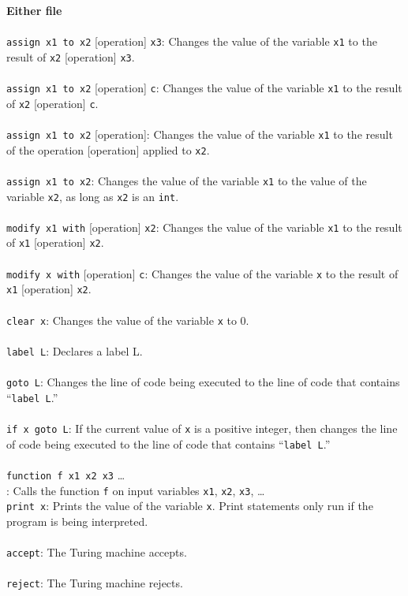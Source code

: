 \documentclass{report}
\begin{document}
\textbf{Either file} \\ \\
\texttt{assign x1 to x2} [operation] \texttt{x3}: Changes the value of the variable \texttt{x1} to the result of \texttt{x2} [operation] \texttt{x3}. \\ \\
\texttt{assign x1 to x2} [operation] \texttt{c}: Changes the value of the variable \texttt{x1} to the result of \texttt{x2} [operation] \texttt{c}. \\ \\
\texttt{assign x1 to x2} [operation]: Changes the value of the variable \texttt{x1} to the result of the operation [operation] applied to \texttt{x2}. \\ \\
\texttt{assign x1 to x2}: Changes the value of the variable \texttt{x1} to the value of the variable \texttt{x2}, as long as \texttt{x2} is an \texttt{int}. \\ \\
\texttt{modify x1 with} [operation] \texttt{x2}: Changes the value of the variable \texttt{x1} to the result of \texttt{x1} [operation] \texttt{x2}. \\ \\
\texttt{modify x with} [operation] \texttt{c}: Changes the value of the variable \texttt{x} to the result of \texttt{x1} [operation] \texttt{x2}. \\ \\
\texttt{clear x}: Changes the value of the variable \texttt{x} to 0. \\ \\
\texttt{label L}: Declares a label L. \\ \\
\texttt{goto L}: Changes the line of code being executed to the line of code that contains ``\texttt{label L}.'' \\ \\
\texttt{if x goto L}: If the current value of \texttt{x} is a positive integer, then changes the line of code being executed to the line of code that contains ``\texttt{label L}.'' \\ \\
\texttt{function f x1 x2 x3} \dots \\: Calls the function \texttt{f} on input variables \texttt{x1}, \texttt{x2}, \texttt{x3}, \dots \\
\texttt{print x}: Prints the value of the variable \texttt{x}. Print statements only run if the program is being interpreted. \\ \\
\texttt{accept}: The Turing machine accepts. \\ \\ 
\texttt{reject}: The Turing machine rejects. 
\end{document}
